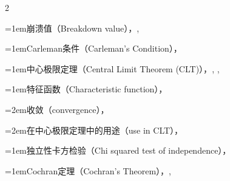\begin{multicols}{2}
\par\addvspace{2pt}
\par\noindent\hangindent=1em\hspace*{0em}\label{idx:100}崩溃值（Breakdown value），\hyperref[def:10.2.2]{\pageref*{def:10.2.2}}, \hyperref[exercise:10.20]{\pageref*{exercise:10.20}}\par
\par\addvspace{2pt}
\par\noindent\hangindent=1em\hspace*{0em}\label{idx:101}Carleman条件（Carleman’s Condition），\hyperref[idxocc:101:99]{\pageref*{idxocc:101:99}}\par
\par\addvspace{2pt}
\par\noindent\hangindent=1em\hspace*{0em}\label{idx:102}中心极限定理（Central Limit Theorem (CLT)），\hyperref[thm:5.5.14]{\pageref*{thm:5.5.14}}, \hyperref[thm:5.5.15]{\pageref*{thm:5.5.15}}, \hyperref[sec:5.8.1]{\pageref*{sec:5.8.1}}\par
\par\addvspace{2pt}
\par\noindent\hangindent=1em\hspace*{0em}\label{idx:103}特征函数（Characteristic function），\hyperref[idxocc:103:100]{\pageref*{idxocc:103:100}}\par
\par\noindent\hangindent=2em\hspace*{1em}\label{idx:104}收敛（convergence），\hyperref[thm:2.6.1]{\pageref*{thm:2.6.1}}\par
\par\noindent\hangindent=2em\hspace*{1em}\label{idx:105}在中心极限定理中的用途（use in CLT），\hyperref[thm:5.5.15]{\pageref*{thm:5.5.15}}\par
\par\addvspace{2pt}
\par\noindent\hangindent=1em\hspace*{0em}\label{idx:106}独立性卡方检验（Chi squared test of independence），\hyperref[exercise:10.31]{\pageref*{exercise:10.31}}\par
\par\addvspace{2pt}
\par\noindent\hangindent=1em\hspace*{0em}\label{idx:107}Cochran定理（Cochran’s Theorem），\hyperref[idxocc:107:465]{\pageref*{idxocc:107:465}}, \hyperref[sec:11.5.1]{\pageref*{sec:11.5.1}}\par

\end{multicols}
